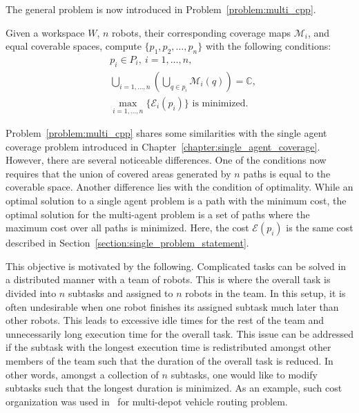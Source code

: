 \documentclass[../main.tex]{subfiles}
\begin{document}
The general problem is now introduced in Problem~\ref{problem:multi_cpp}.
\begin{problem}
\label{problem:multi_cpp}
	Given a workspace $W$, $n$ robots, their corresponding coverage maps $\mathcal{M}_i$, and equal coverable spaces, compute $\{p_1,p_2,\ldots,p_n\}$ with the following conditions:
	\begin{equation}
	\begin{aligned}
		& p_i\in P_{i},\ i=1,\dots,n,\\
		& \bigcup_{i=1,\dots,n}(\bigcup_{q\in p_i}\mathcal{M}_i(q))=\mathbb{C},\\
		& \max_{i=1,\ldots,n}\{\mathcal{E}_i(p_i)\}\text{ is minimized.}
	\end{aligned}
	\end{equation}
\end{problem}

Problem~\ref{problem:multi_cpp} shares some similarities with the single agent coverage problem introduced in Chapter~\ref{chapter:single_agent_coverage}. However, there are several noticeable differences. One of the conditions now requires that the union of covered areas generated by $n$ paths is equal to the coverable space. Another difference lies with the condition of optimality. While an optimal solution to a single agent problem is a path with the minimum cost, the optimal solution for the multi-agent problem is a set of paths where the maximum cost over all paths is minimized. Here, the cost $\mathcal{E}(p_i)$ is the same cost described in Section~\ref{section:single_problem_statement}.

This objective is motivated by the following. Complicated tasks can be solved in a distributed manner with a team of robots. This is where the overall task is divided into $n$ subtasks and assigned to $n$ robots in the team. In this setup, it is often undesirable when one robot finishes its assigned subtask much later than other robots. This leads to excessive idle times for the rest of the team and unnecessarily long execution time for the overall task. This issue can be addressed if the subtask with the longest execution time is redistributed amongst other members of the team such that the duration of the overall task is reduced. In other words, amongst a collection of $n$ subtasks, one would like to modify subtasks such that the longest duration is minimized. As an example, such cost organization was used in~\cite{carlsson2009solving} for multi-depot vehicle routing problem.
\end{document}
